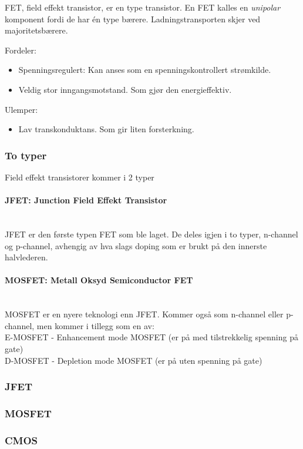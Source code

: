FET, field effekt transistor, er en type transistor.
En FET kalles en \emph{unipolar} komponent fordi de har én type bærere.
Ladningstransporten skjer ved majoritetsbærere.

Fordeler:
\begin{itemize}
\item Spenningsregulert: Kan anses som en spenningskontrollert strømkilde.
\item Veldig stor inngangsmotstand. Som gjør den energieffektiv.
\end{itemize}

Ulemper:
\begin{itemize}
\item Lav transkonduktans. Som gir liten forsterkning.
\end{itemize}



\subsubsection{To typer}
Field effekt transistorer kommer i 2 typer
\\
\paragraph{JFET: Junction Field Effekt Transistor} \mbox{} \\
JFET er den første typen FET som ble laget.
De deles igjen i to typer, n-channel og p-channel, avhengig av hva slags doping
som er brukt på den innerste halvlederen.
\\
\paragraph{MOSFET: Metall Oksyd Semiconductor FET} \mbox{} \\
MOSFET er en nyere teknologi enn JFET.
Kommer også som n-channel eller p-channel, men kommer i tillegg som en av:\\
E-MOSFET - Enhancement mode MOSFET (er på med tilstrekkelig spenning på gate) \\
D-MOSFET - Depletion mode MOSFET (er på uten spenning på gate)



\subsubsection{JFET}


\subsubsection{MOSFET}


\subsubsection{CMOS}

